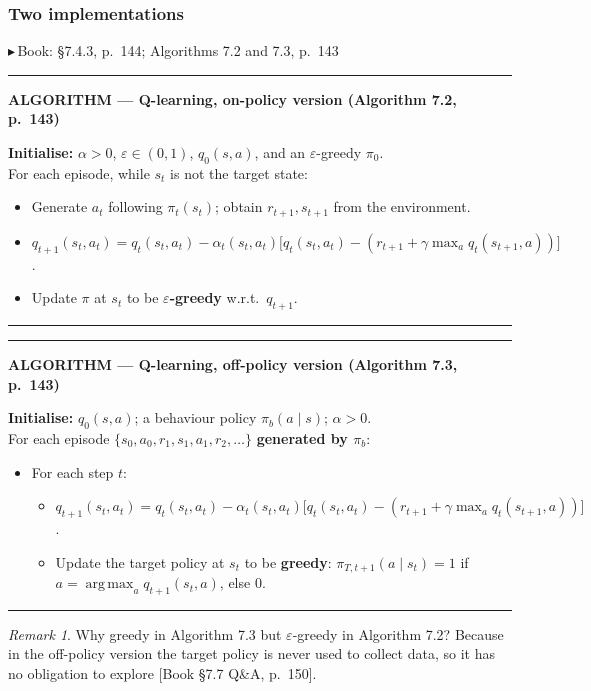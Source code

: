 \documentclass[11pt, letterpaper]{article}
\theoremstyle{runin}
\theoremstyle{runinplain}
\theoremstyle{remark}
\newtheorem*{remark}{Remark}
\newcommand{\argmax}{\operatorname*{arg\,max}}
\newcommand{\bk}[1]{{\color{bookblue}\small$\blacktriangleright$\,\textsf{Book: #1}}}
\newcommand{\bkin}[1]{{\color{bookblue}\small[\textsf{Book #1}]}}
\newenvironment{algobox}[1]
  {\par\medskip\noindent\rule{\textwidth}{0.9pt}\par\nobreak\vspace{0.25em}
   \noindent\textbf{\small ALGORITHM --- #1}\par\nobreak\vspace{0.15em}
   \small}
  {\par\nobreak\vspace{0.25em}\noindent\rule{\textwidth}{0.9pt}\par\medskip}
\begin{document}
\subsubsection{Two implementations}

\bk{\S7.4.3, p.~144; Algorithms 7.2 and 7.3, p.~143}

\begin{algobox}{Q-learning, on-policy version (Algorithm 7.2, p.~143)}
\textbf{Initialise:} $\alpha>0$, $\varepsilon\in(0,1)$, $q_0(s,a)$, and an
$\varepsilon$-greedy $\pi_0$.\\
For each episode, while $s_t$ is not the target state:
\begin{itemize}\itemsep0pt
  \item Generate $a_t$ following $\pi_t(s_t)$; obtain $r_{t+1},s_{t+1}$ from the
        environment.
  \item $q_{t+1}(s_t,a_t)=q_t(s_t,a_t)-\alpha_t(s_t,a_t)\bigl[q_t(s_t,a_t)-(r_{t+1}+\gamma\max_a q_t(s_{t+1},a))\bigr]$.
  \item Update $\pi$ at $s_t$ to be \textbf{$\varepsilon$-greedy} w.r.t.\ $q_{t+1}$.
\end{itemize}
\end{algobox}

\begin{algobox}{Q-learning, off-policy version (Algorithm 7.3, p.~143)}
\textbf{Initialise:} $q_0(s,a)$; a behaviour policy $\pi_b(a\mid s)$; $\alpha>0$.\\
For each episode $\{s_0,a_0,r_1,s_1,a_1,r_2,\dots\}$ \textbf{generated by $\pi_b$}:
\begin{itemize}\itemsep0pt
  \item For each step $t$:
    \begin{itemize}\itemsep0pt
      \item $q_{t+1}(s_t,a_t)=q_t(s_t,a_t)-\alpha_t(s_t,a_t)\bigl[q_t(s_t,a_t)-(r_{t+1}+\gamma\max_a q_t(s_{t+1},a))\bigr]$.
      \item Update the target policy at $s_t$ to be \textbf{greedy}:
            $\pi_{T,t+1}(a\mid s_t)=1$ if $a=\argmax_a q_{t+1}(s_t,a)$, else $0$.
    \end{itemize}
\end{itemize}
\end{algobox}

\begin{remark}
Why greedy in Algorithm 7.3 but $\varepsilon$-greedy in Algorithm 7.2? Because in
the off-policy version the target policy is never used to collect data, so it has no
obligation to explore \bkin{\S7.7 Q\&A, p.~150}.
\end{remark}
\end{document}

